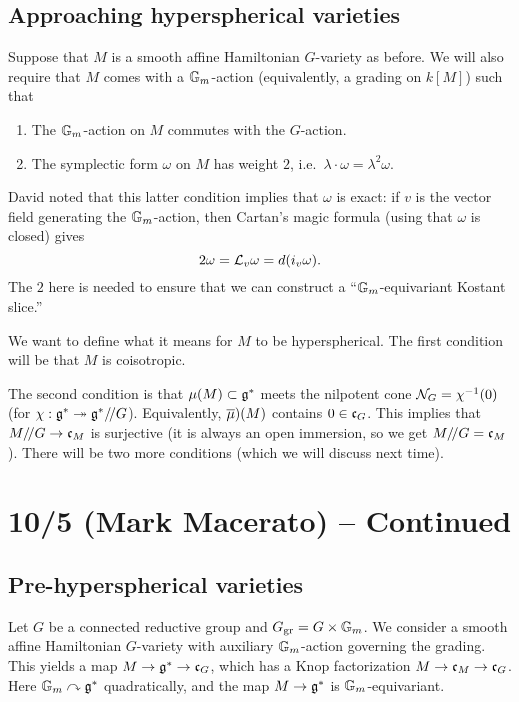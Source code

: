 \documentclass{article}
\begin{document}
\subsection{Approaching hyperspherical varieties}

Suppose that $M$ is a smooth affine Hamiltonian $G$-variety as before.
We will also require that $M$ comes with a $\mathbb{G}_m$-action (equivalently, a grading on $k[M]$) such that
\begin{enumerate}
	\item The $\mathbb{G}_m$-action on $M$ commutes with the $G$-action.
	\item The symplectic form $\omega$ on $M$ has weight $2$, i.e.\ $\lambda \cdot \omega = \lambda^2 \omega$.
\end{enumerate}
David noted that this latter condition implies that $\omega$ is exact: if $v$ is the vector field generating the $\mathbb{G}_m$-action, then Cartan's magic formula (using that $\omega$ is closed) gives
\[
	2 \omega = \mathcal{L}_v \omega = d(i_v \omega).
\]
The $2$ here is needed to ensure that we can construct a ``$\mathbb{G}_m$-equivariant Kostant slice.''

We want to define what it means for $M$ to be hyperspherical.
The first condition will be that $M$ is coisotropic.

The second condition is that $\mu(M) \subset \mathfrak{g}^*$ meets the nilpotent cone $\mathcal{N}_G = \chi^{-1}(0)$ (for $\chi: \mathfrak{g}^* \twoheadrightarrow \mathfrak{g}^* /\mkern-3mu/ G$).
Equivalently, $\overline{\mu})(M)$ contains $0 \in \mathfrak{c}_G$.
This implies that $M /\mkern-3mu/ G \to \mathfrak{c}_M$ is surjective (it is always an open immersion, so we get $M /\mkern-3mu/ G = \mathfrak{c}_M$).
There will be two more conditions (which we will discuss next time).

\section{10/5 (Mark Macerato) -- Continued}

\subsection{Pre-hyperspherical varieties}

Let $G$ be a connected reductive group and $G_{\operatorname{gr}} = G \times \mathbb{G}_m$.
We consider a smooth affine Hamiltonian $G$-variety with auxiliary $\mathbb{G}_m$-action governing the grading.
This yields a map $M \to \mathfrak{g}^* \to \mathfrak{c}_G$, which has a Knop factorization $M \to \mathfrak{c}_M \to \mathfrak{c}_G$.
Here $\mathbb{G}_m \curvearrowright \mathfrak{g}^*$ quadratically, and the map $M \to \mathfrak{g}^*$ is $\mathbb{G}_m$-equivariant.
\end{document}
